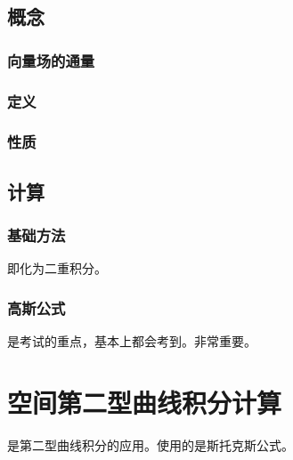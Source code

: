 \documentclass[UTF8, 12pt]{ctexart}
\begin{document}
\subsection{概念}

\subsubsection{向量场的通量}

\subsubsection{定义}

\subsubsection{性质}

\subsection{计算}

\subsubsection{基础方法}

即化为二重积分。

\subsubsection{高斯公式}

是考试的重点，基本上都会考到。非常重要。

\section{空间第二型曲线积分计算}

是第二型曲线积分的应用。使用的是斯托克斯公式。
\end{document}
